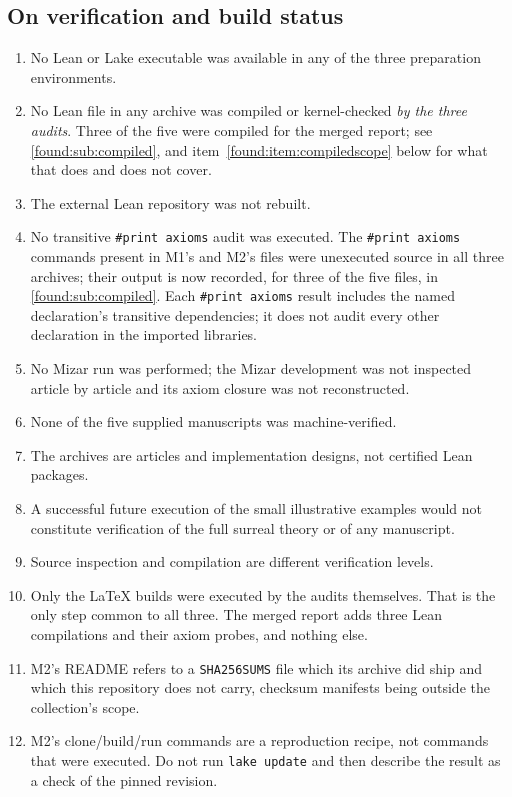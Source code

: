 \documentclass[11pt,letterpaper]{article}
\numberwithin{equation}{section}
\theoremstyle{definition}
\theoremstyle{remark}
\begin{document}
\subsection{On verification and build status}
\label{found:app:limbuild}
\begin{enumerate}
\item No Lean or Lake executable was available in any of the three preparation
environments.
\item No Lean file in any archive was compiled or kernel-checked \emph{by
the three audits}. Three of the five were compiled for the merged report; see
\cref{found:sub:compiled}, and item~\ref{found:item:compiledscope} below for
what that does and does not cover.
\item The external Lean repository was not rebuilt.
\item No transitive \texttt{\#print axioms} audit was executed. The
\texttt{\#print axioms} commands present in M1's and M2's files were unexecuted
source in all three archives; their output is now recorded, for three of the
five files, in \cref{found:sub:compiled}. Each \texttt{\#print axioms} result includes the named declaration's
transitive dependencies; it does not audit every other declaration in the
imported libraries.
\item No Mizar run was performed; the Mizar development was not inspected
article by article and its axiom closure was not reconstructed.
\item None of the five supplied manuscripts was machine-verified.
\item The archives are articles and implementation designs, not certified Lean
packages.
\item A successful future execution of the small illustrative examples would not
constitute verification of the full surreal theory or of any manuscript.
\item Source inspection and compilation are different verification levels.
\item Only the \LaTeX{} builds were executed by the audits themselves. That
is the only step common to all three. The merged report adds three Lean
compilations and their axiom probes, and nothing else.
\label{found:item:compiledscope}
\item M2's README refers to a \texttt{SHA256SUMS} file which its archive did
ship and which this repository does not carry, checksum manifests being outside
the collection's scope.
\item M2's clone/build/run commands are a reproduction recipe, not commands that
were executed. Do not run \texttt{lake update} and then describe the result as a
check of the pinned revision.
\end{enumerate}
\end{document}
